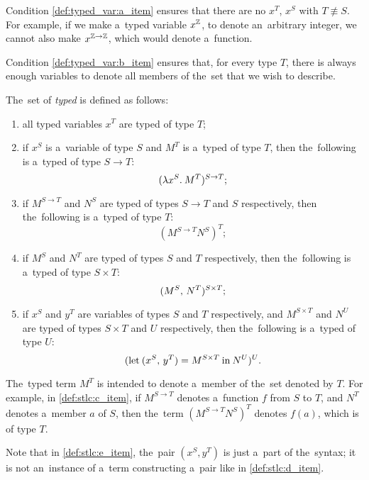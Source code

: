 Condition \ref{def:typed_var:a_item} ensures that there are no $x^T$, $x^S$ with
$T \not\equiv S$. For example, if we make a~typed variable $x^{\mathbb{Z}}$, to denote
an~arbitrary integer, we cannot also make $x^{\mathbb{Z} \to \mathbb{Z}}$, which would
denote a~function.

Condition \ref{def:typed_var:b_item} ensures that, for every type $T$, there
is always enough variables to denote all members of the~set that we wish to
describe.

\begin{definition}\label{def:stlc}
  The~set of \emph{typed \lts} is defined as follows:
  \begin{enumerate}
    \item all typed variables $x^T$ are typed \lts of type $T$;
    \item if $x^S$ is a~variable of type $S$ and $M^T$ is a~typed \lt of type
      $T$, then the~following is a~typed \lt of type $S \to T$:
      \[
        (\lambda x^S . \: M^T)^{S \to T};
      \]
    \item \label{def:stlc:c_item} if $M^{S \to T}$ and $N^S$ are typed \lts
      of types $S \to T$ and $S$ respectively, then the~following is a~typed
      \lt of type $T$:
      \[
        (M^{S \to T} N^S)^T;
      \]
    \item \label{def:stlc:d_item} if $M^S$ and $N^T$ are typed \lts of types
      $S$ and $T$ respectively, then the~following is a~typed \lt of type
      $S \times T$:
      \[
        (M^S, \, N^T) ^{S \times T};
      \]
    \setcounter{stlc_counter}{\value{enumi}}
    \item \label{def:stlc:e_item} if $x^S$ and $y^T$ are variables of types $S$
      and $T$ respectively, and $M^{S \times T}$ and $N^U$ are typed \lts of
      types $S \times T$ and $U$ respectively, then the~following is a~typed
      \lt of type $U$:
      \[
        (\textrm{let} \: (x^S, \, y^T) = M^{S \times T} \:
        \textrm{in} \: N^{U})^U.
      \]
\end{enumerate}
\end{definition}

The~typed term $M^T$ is intended to denote a~member of the~set denoted by $T$.
For example, in \ref{def:stlc:c_item}, if $M^{S \to T}$ denotes a~function $f$
from $S$ to $T$, and $N^T$ denotes a~member $a$ of $S$, then the~term
$(M^{S \to T} N^S)^T$ denotes $f(a)$, which is of type $T$.

Note that in \ref{def:stlc:e_item}, the~pair $(x^S, y^T)$ is just a~part of
the~syntax; it is not an~instance of a~term constructing a~pair like in
\ref{def:stlc:d_item}.

